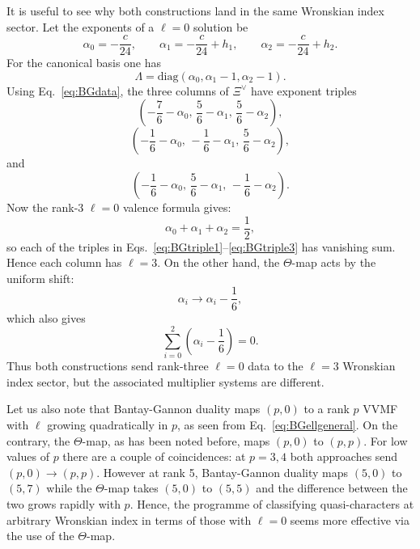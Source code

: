 \documentclass[11pt]{article}
\newcommand\be{\begin{equation}}
\newcommand\ee{\end{equation}}
\begin{document}
It is useful to see why both constructions land in the same Wronskian index sector. Let the exponents of a $\ell=0$ solution be
\[
\alpha_0=-\frac{c}{24},\qquad
\alpha_1=-\frac{c}{24}+h_1,\qquad
\alpha_2=-\frac{c}{24}+h_2 .
\]
For the canonical basis one has \cite{Govindarajan:2025jlq}
\begin{equation}
\Lambda=\mathrm{diag}(\alpha_0,\alpha_1-1,\alpha_2-1).
\label{eq:rank3Lambda}
\end{equation}
Using Eq.~\eqref{eq:BGdata}, the three columns of \(\Xi^\vee\) have exponent
triples
\begin{equation}
\left(
-\frac76-\alpha_0,\,
\frac56-\alpha_1,\,
\frac56-\alpha_2
\right),
\label{eq:BGtriple1}
\end{equation}
\begin{equation}
\left(
-\frac16-\alpha_0,\,
-\frac16-\alpha_1,\,
\frac56-\alpha_2
\right),
\label{eq:BGtriple2}
\end{equation}
and
\begin{equation}
\left(
-\frac16-\alpha_0,\,
\frac56-\alpha_1,\,
-\frac16-\alpha_2
\right).
\label{eq:BGtriple3}
\end{equation}
Now the rank-3 \(\ell=0\) valence formula gives:
\be
\alpha_0+\alpha_1+\alpha_2=\frac12,
\ee
so each of the triples in Eqs.~\eqref{eq:BGtriple1}--\eqref{eq:BGtriple3} has vanishing sum. Hence each column has \(\ell=3\). On the other hand, the \(\Theta\)-map acts by the uniform shift:
\begin{equation}
\alpha_i\to \alpha_i-\frac16 ,
\label{eq:Theta_uniform_shift}
\end{equation}
which also gives
\be
\sum_{i=0}^2\left(\alpha_i-\frac16\right)=0.
\ee
Thus both constructions send rank-three $\ell=0$ data to the $\ell=3$ Wronskian index sector, but the associated multiplier systems are different.

Let us also note that Bantay-Gannon duality maps $(p,0)$ to a rank $p$ VVMF with $\ell$ growing quadratically in $p$, as seen from Eq.~\eqref{eq:BGellgeneral}. On the contrary, the $\Theta$-map, as has been noted before, maps $(p,0)$ to $(p,p)$. For low values of $p$ there are a couple of coincidences: at $p=3,4$ both approaches send $(p,0)\to(p,p)$. However at rank 5, Bantay-Gannon duality maps $(5,0)$ to $(5,7)$ while the $\Theta$-map takes $(5,0)$ to $(5,5)$ and the difference between the two grows rapidly with $p$. Hence, the programme of classifying quasi-characters at arbitrary Wronskian index in terms of those with $\ell=0$ seems more effective via the use of the $\Theta$-map.
\end{document}
